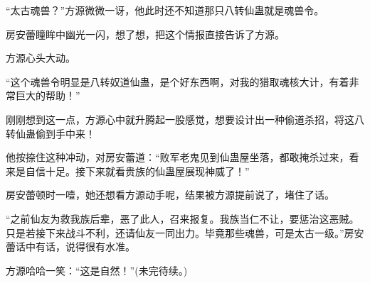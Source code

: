 \begin{this_body}
“太古魂兽？”方源微微一讶，他此时还不知道那只八转仙蛊就是魂兽令。

房安蕾瞳眸中幽光一闪，想了想，把这个情报直接告诉了方源。

方源心头大动。

“这个魂兽令明显是八转奴道仙蛊，是个好东西啊，对我的猎取魂核大计，有着非常巨大的帮助！”

刚刚想到这一点，方源心中就升腾起一股感觉，想要设计出一种偷道杀招，将这八转仙蛊偷到手中来！

他按捺住这种冲动，对房安蕾道：“败军老鬼见到仙蛊屋坐落，都敢掩杀过来，看来是自信十足。接下来就看贵族的仙蛊屋展现神威了！”

房安蕾顿时一噎，她还想看方源动手呢，结果被方源提前说了，堵住了话。

“之前仙友为救我族后辈，恶了此人，召来报复。我族当仁不让，要惩治这恶贼。只是若接下来战斗不利，还请仙友一同出力。毕竟那些魂兽，可是太古一级。”房安蕾话中有话，说得很有水准。

方源哈哈一笑：“这是自然！”(未完待续。)

\end{this_body}

